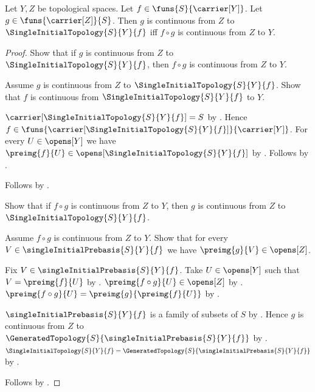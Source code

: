 \begin{theorem}\label{single_initial_topology_universal_property}
    Let $Y,Z$ be topological spaces.
    Let $f\in\funs{S}{\carrier[Y]}$.
    Let $g\in\funs{\carrier[Z]}{S}$.
    Then $g$ is continuous from $Z$ to $\SingleInitialTopology{S}{Y}{f}$
        iff $f\circ g$ is continuous from $Z$ to $Y$.
\end{theorem}
\begin{proof}
    Show that if $g$ is continuous from $Z$ to
        $\SingleInitialTopology{S}{Y}{f}$, then
        $f\circ g$ is continuous from $Z$ to $Y$.
    \begin{subproof}
        Assume $g$ is continuous from $Z$ to
            $\SingleInitialTopology{S}{Y}{f}$.
        Show that $f$ is continuous from $\SingleInitialTopology{S}{Y}{f}$
            to $Y$.
        \begin{subproof}
            $\carrier[\SingleInitialTopology{S}{Y}{f}]=S$ by
                .
            Hence $f\in\funs{\carrier[\SingleInitialTopology{S}{Y}{f}]}
                {\carrier[Y]}$.
            For every $U\in\opens[Y]$ we have
                $\preimg{f}{U}\in
                    \opens[\SingleInitialTopology{S}{Y}{f}]$ by
                .
            Follows by .
        \end{subproof}
        Follows by .
    \end{subproof}
    Show that if $f\circ g$ is continuous from $Z$ to $Y$, then
        $g$ is continuous from $Z$ to $\SingleInitialTopology{S}{Y}{f}$.
    \begin{subproof}
        Assume $f\circ g$ is continuous from $Z$ to $Y$.
        Show that for every $V\in\singleInitialPrebasis{S}{Y}{f}$ we have
            $\preimg{g}{V}\in\opens[Z]$.
        \begin{subproof}
            Fix $V\in\singleInitialPrebasis{S}{Y}{f}$.
            Take $U\in\opens[Y]$ such that $V=\preimg{f}{U}$ by
                .
            $\preimg{f\circ g}{U}\in\opens[Z]$ by
                .
            $\preimg{f\circ g}{U}=\preimg{g}{\preimg{f}{U}}$ by
                .
        \end{subproof}
        $\singleInitialPrebasis{S}{Y}{f}$ is a family of subsets of $S$ by
            .
        Hence $g$ is continuous from $Z$ to
            $\GeneratedTopology{S}{\singleInitialPrebasis{S}{Y}{f}}$ by
            .
        $\SingleInitialTopology{S}{Y}{f}
            =\GeneratedTopology{S}{\singleInitialPrebasis{S}{Y}{f}}$ by
            .
    \end{subproof}
    Follows by \auto.
\end{proof}

